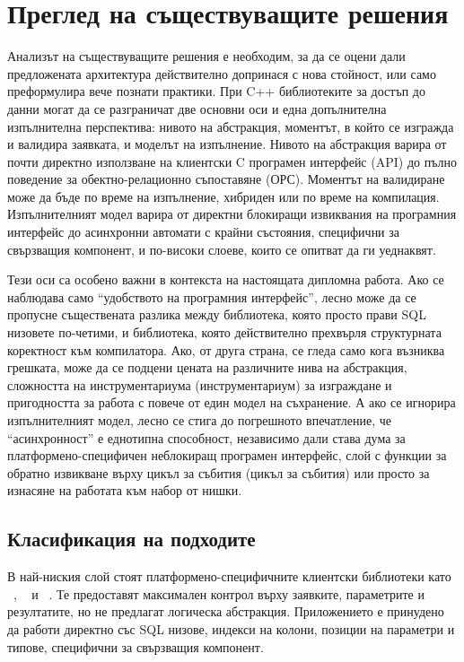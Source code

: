\section{Преглед на съществуващите решения}
\label{sec:existing_solutions}

Анализът на съществуващите решения е необходим, за да се оцени дали предложената архитектура действително допринася с нова стойност, или само преформулира вече познати практики. При C++ библиотеките за достъп до данни могат да се разграничат две основни оси и една допълнителна изпълнителна перспектива: нивото на абстракция, моментът, в който се изгражда и валидира заявката, и моделът на изпълнение. Нивото на абстракция варира от почти директно използване на клиентски C програмен интерфейс (API) до пълно поведение за обектно-релационно съпоставяне (ОРС). Моментът на валидиране може да бъде по време на изпълнение, хибриден или по време на компилация. Изпълнителният модел варира от директни блокиращи извиквания на програмния интерфейс до асинхронни автомати с крайни състояния, специфични за свързващия компонент, и по-високи слоеве, които се опитват да ги уеднаквят.

Тези оси са особено важни в контекста на настоящата дипломна работа. Ако се наблюдава само ``удобството на програмния интерфейс'', лесно може да се пропусне съществената разлика между библиотека, която просто прави SQL низовете по-четими, и библиотека, която действително прехвърля структурната коректност към компилатора. Ако, от друга страна, се гледа само кога възниква грешката, може да се подцени цената на различните нива на абстракция, сложността на инструментариума (инструментариум) за изграждане и пригодността за работа с повече от един модел на съхранение. А ако се игнорира изпълнителният модел, лесно се стига до погрешното впечатление, че ``асинхронност'' е еднотипна способност, независимо дали става дума за платформено-специфичен неблокиращ програмен интерфейс, слой с функции за обратно извикване върху цикъл за събития (цикъл за събития) или просто за изнасяне на работата към набор от нишки.

\subsection{Класификация на подходите}

В най-ниския слой стоят платформено-специфичните клиентски библиотеки като ~\cite{sqlite_api}, ~\cite{libpq} и ~\cite{mysql_connector}. Те предоставят максимален контрол върху заявките, параметрите и резултатите, но не предлагат логическа абстракция. Приложението е принудено да работи директно със SQL низове, индекси на колони, позиции на параметри и типове, специфични за свързващия компонент.

